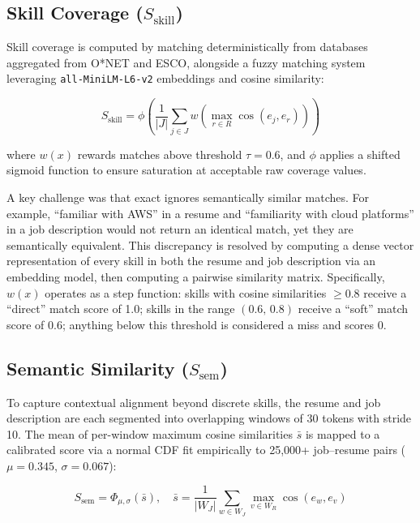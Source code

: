 \documentclass[12pt]{article}
\begin{document}
\subsection{Skill Coverage ($S_{\text{skill}}$)}

Skill coverage is computed by matching deterministically from databases aggregated from O*NET and ESCO, alongside a fuzzy matching system leveraging \texttt{all-MiniLM-L6-v2} embeddings and cosine similarity:

\begin{equation}
    S_{\text{skill}} = \phi\!\left(\frac{1}{|J|} \sum_{j \in J} w\!\left(\max_{r \in R} \cos(e_j, e_r)\right)\right)
\end{equation}

\noindent where $w(x)$ rewards matches above threshold $\tau = 0.6$, and $\phi$ applies a shifted sigmoid function to ensure saturation at acceptable raw coverage values.

A key challenge was that exact  ignores semantically similar matches. 
For example, ``familiar with AWS'' in a resume and ``familiarity with cloud platforms'' in a job description would not return an identical match, yet they are semantically equivalent.
This discrepancy is resolved by computing a dense vector representation of every skill in both the resume and job description via an embedding model, then computing a pairwise similarity matrix. 
Specifically, $w(x)$ operates as a step function: skills with cosine similarities $\geq 0.8$ receive a ``direct'' match score of 1.0; skills in the range $(0.6,\, 0.8)$ receive a ``soft'' match score of 0.6; anything below this threshold is considered a miss and scores 0.

\subsection{Semantic Similarity ($S_{\text{sem}}$)}

To capture contextual alignment beyond discrete skills, the resume and job description are each segmented into overlapping windows of 30 tokens with stride 10.
The mean of per-window maximum cosine similarities $\bar{s}$ is mapped to a calibrated score via a normal CDF fit empirically to 25,000+ job--resume pairs ($\mu = 0.345$, $\sigma = 0.067$):

\begin{equation}
    S_{\text{sem}} = \Phi_{\mu,\sigma}(\bar{s}), \quad \bar{s} = \frac{1}{|W_J|} \sum_{w \in W_J} \max_{v \in W_R} \cos(e_w, e_v)
\end{equation}
\end{document}
